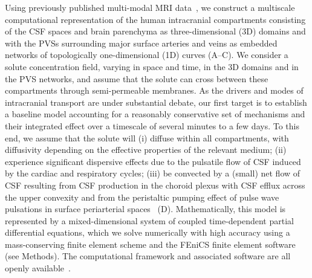 \documentclass[fleqn,10pt]{wlscirep}
\begin{document}
Using previously published multi-modal MRI
data~\cite{hodneland2019new, deistung2009tof,
  schweser2012quantitative, reichenbach2012future,
  deistung2017overview}, we construct a multiscale computational
representation of the human intracranial compartments consisting of
the CSF spaces and brain parenchyma as three-dimensional (3D) domains
and with the PVSs surrounding major surface arteries and veins as
embedded networks of topologically one-dimensional (1D) curves
(A--C). We consider a solute concentration field,
varying in space and time, in the 3D domains and in the PVS networks,
and assume that the solute can cross between these compartments
through semi-permeable membranes. As the drivers and modes of
intracranial transport are under substantial
debate\cite{smith2019going, proulx2021cerebrospinal,
  bohr2022glymphatic, hladky2022glymphatic, betsholtz2024advances},
our first target is to establish a baseline model accounting for a
reasonably conservative set of mechanisms and their integrated effect
over a timescale of several minutes to a few days. To this end, we
assume that the solute will (i) diffuse within all compartments, with
diffusivity depending on the effective properties of the relevant
medium\cite{sykova2008diffusion}; (ii) experience significant
dispersive effects due to the pulsatile flow of CSF induced by the
cardiac and respiratory cycles\cite{vinje2019respiratory,
  keith2019dispersion, ray2021quantitative, troyetsky2021dispersion};
(iii) be convected by a (small) net flow of CSF resulting from CSF
production in the choroid plexus with CSF efflux across the upper
convexity\cite{hornkjol2022csf} and from the peristaltic pumping
effect of pulse wave pulsations in surface periarterial
spaces~\cite{mestre2018flow, gjerde2023directional}
(D). Mathematically, this model is represented by a
mixed-dimensional system of coupled time-dependent partial
differential equations\cite{masri2024modelling}, which we solve
numerically with high accuracy using a mass-conserving finite element
scheme and the FEniCS finite element software\cite{alnaes2015fenics,
  kuchta2020assembly} (see Methods). The computational framework and
associated software are all openly available~\cite{ZENODO}.
\end{document}
